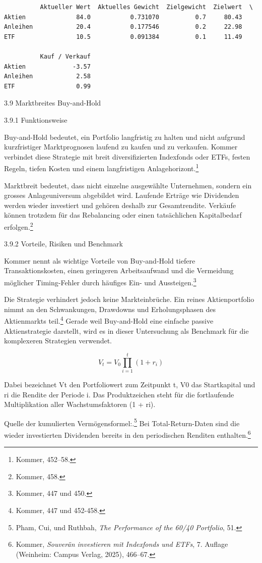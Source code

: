 \documentclass[
  ngerman,
  a4paper,
  DIV=11,
  oneside]{scrreprt}
\begin{document}
\begin{verbatim}
          Aktueller Wert  Aktuelles Gewicht  Zielgewicht  Zielwert  \
Aktien              84.0           0.731070          0.7     80.43   
Anleihen            20.4           0.177546          0.2     22.98   
ETF                 10.5           0.091384          0.1     11.49   

          Kauf / Verkauf  
Aktien             -3.57  
Anleihen            2.58  
ETF                 0.99  
\end{verbatim}

3.9 Marktbreites Buy-and-Hold

3.9.1 Funktionsweise

Buy-and-Hold bedeutet, ein Portfolio langfristig zu halten und nicht
aufgrund kurzfristiger Marktprognosen laufend zu kaufen und zu
verkaufen. Kommer verbindet diese Strategie mit breit diversifizierten
Indexfonds oder ETFs, festen Regeln, tiefen Kosten und einem
langfristigen Anlagehorizont.\footnote{Kommer, 452--58.}

Marktbreit bedeutet, dass nicht einzelne ausgewählte Unternehmen,
sondern ein grosses Anlageuniversum abgebildet wird. Laufende Erträge
wie Dividenden werden wieder investiert und gehören deshalb zur
Gesamtrendite. Verkäufe können trotzdem für das Rebalancing oder einen
tatsächlichen Kapitalbedarf erfolgen.\footnote{Kommer, 458.}

3.9.2 Vorteile, Risiken und Benchmark

Kommer nennt als wichtige Vorteile von Buy-and-Hold tiefere
Transaktionskosten, einen geringeren Arbeitsaufwand und die Vermeidung
möglicher Timing-Fehler durch häufiges Ein- und Aussteigen.\footnote{Kommer,
  447 und 450.}

Die Strategie verhindert jedoch keine Markteinbrüche. Ein reines
Aktienportfolio nimmt an den Schwankungen, Drawdowns und Erholungsphasen
des Aktienmarkts teil.\footnote{Kommer, 447 und 452-458.} Gerade weil
Buy-and-Hold eine einfache passive Aktienstrategie darstellt, wird es in
dieser Untersuchung als Benchmark für die komplexeren Strategien
verwendet.

\[
V_t=V_0\prod_{i=1}^{t}(1+r_i)
\]

Dabei bezeichnet Vt den Portfoliowert zum Zeitpunkt t, V0 das
Startkapital und ri die Rendite der Periode i. Das Produktzeichen steht
für die fortlaufende Multiplikation aller Wachstumsfaktoren (1 + ri).

Quelle der kumulierten Vermögensformel:.\footnote{Pham, Cui, und
  Ruthbah, \emph{The {Performance} of the 60/40 {Portfolio}}, 51.} Bei
Total-Return-Daten sind die wieder investierten Dividenden bereits in
den periodischen Renditen enthalten.\footnote{Kommer, \emph{Souverän
  investieren mit Indexfonds und ETFs}, 7. Auflage (Weinheim: Campus
  Verlag, 2025), 466--67.}
\end{document}
